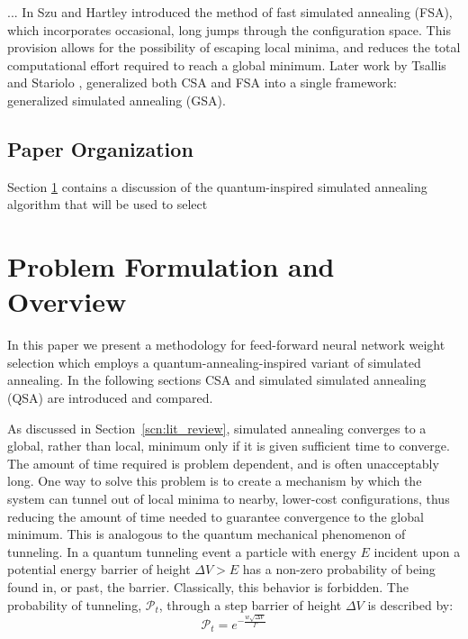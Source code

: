 \documentclass[10pt,journal,cspaper,compsoc]{IEEEtran}
\begin{document}
... In \cite{} Szu and Hartley introduced the method of fast simulated annealing (FSA), which incorporates occasional, long jumps through the configuration space. This provision allows for the possibility of escaping local minima, and reduces the total computational effort required to reach a global minimum. Later work by Tsallis and Stariolo \cite{}, generalized both CSA and FSA into a single framework: generalized simulated annealing (GSA).

\subsection{Paper Organization}
\label{scn:paper_organization}
Section \ref{scn:problem_formulation} contains a discussion of the quantum-inspired simulated annealing algorithm that will be used to select 

\section{Problem Formulation and Overview}
\label{scn:problem_formulation}

In this paper we present a methodology for feed-forward neural network weight selection which employs a quantum-annealing-inspired variant of simulated annealing. In the following sections CSA and simulated simulated annealing (QSA) are introduced and compared. 

As discussed in Section~\ref{scn:lit_review}, simulated annealing converges to a global, rather than local, minimum only if it is given sufficient time to converge. The amount of time required is problem dependent, and is often unacceptably long. One way to solve this problem is to create a mechanism by which the system can tunnel out of local minima to nearby, lower-cost configurations, thus reducing the amount of time needed to guarantee convergence to the global minimum. This is analogous to the quantum mechanical phenomenon of tunneling. In a quantum tunneling event a particle with energy \begin{math} E \end{math} incident upon a potential energy barrier of height \begin{math} \Delta V > E  \end{math} has a non-zero probability of being found in, or past, the barrier. Classically, this behavior is forbidden. The probability of tunneling, \begin{math} \mathcal{P}_t \end{math}, through a step barrier of height \begin{math} \Delta V  \end{math} is described by: 
\begin{equation} \label{eq:quantum_transition_prob}
\mathcal{P}_t = e^{-\frac{w \sqrt{\Delta V}}{ \Gamma}} 
\end{equation}
\end{document}
